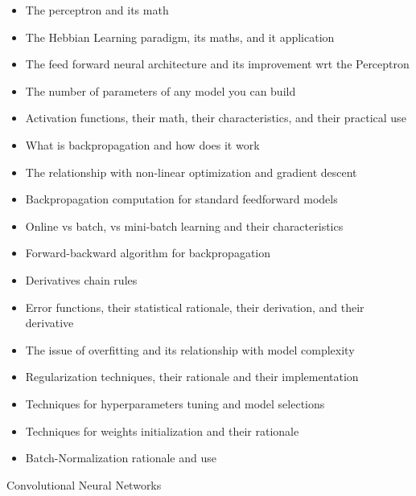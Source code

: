 \begin{itemize}
    \item The perceptron and its math
    \item The Hebbian Learning paradigm, its maths, and it application
    \item The feed forward neural architecture and its improvement wrt the Perceptron
    \item The number of parameters of any model you can build
    \item Activation functions, their math, their characteristics, and their practical use
    \item What is backpropagation and how does it work
    \item The relationship with non-linear optimization and gradient descent
    \item Backpropagation computation for standard feedforward models
    \item Online vs batch, vs mini-batch learning and their characteristics
    \item Forward-backward algorithm for backpropagation
    \item Derivatives chain rules
    \item Error functions, their statistical rationale, their derivation, and their derivative
    \item The issue of overfitting and its relationship with model complexity
    \item Regularization techniques, their rationale and their implementation
    \item Techniques for hyperparameters tuning and model selections
    \item Techniques for weights initialization and their rationale
    \item Batch-Normalization rationale and use
\end{itemize}
Convolutional Neural Networks
